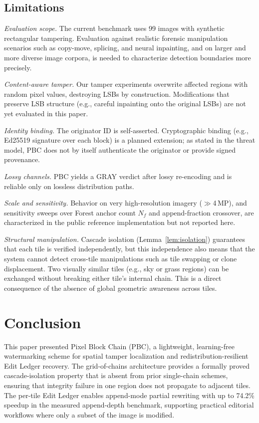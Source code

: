 \documentclass[conference]{IEEEtran}
\begin{document}
\subsection{Limitations}
\label{sec:limitations}

\emph{Evaluation scope.} The current benchmark uses 99 images with
synthetic rectangular tampering. Evaluation against realistic forensic
manipulation scenarios such as copy-move, splicing, and neural
inpainting, and on larger and more diverse image corpora, is needed to
characterize detection boundaries more precisely.

\emph{Content-aware tamper.} Our tamper experiments overwrite affected
regions with random pixel values, destroying LSBs by construction.
Modifications that preserve LSB structure (e.g., careful inpainting
onto the original LSBs) are not yet evaluated in this paper.

\emph{Identity binding.} The originator ID is self-asserted.
Cryptographic binding (e.g., Ed25519 signature over each block) is a
planned extension; as stated in the threat model, PBC does not by itself authenticate the originator or provide signed provenance.

\emph{Lossy channels.} PBC yields a GRAY verdict after lossy
re-encoding and is reliable only on lossless distribution paths.

\emph{Scale and sensitivity.} Behavior on very high-resolution imagery
($\gg$4\,MP), and sensitivity sweeps over Forest anchor count $N_f$
and append-fraction crossover, are characterized in the public
reference implementation but not reported here.

\emph{Structural manipulation.} Cascade isolation
(Lemma~\ref{lem:isolation}) guarantees that each tile is verified
independently, but this independence also means that the system
cannot detect cross-tile manipulations such as tile swapping or
clone displacement. Two visually similar tiles (e.g., sky or grass
regions) can be exchanged without breaking either tile's internal
chain. This is a direct consequence of the absence of global
geometric awareness across tiles.

\section{Conclusion}
\label{sec:conclusion}

This paper presented Pixel Block Chain (PBC), a lightweight,
learning-free watermarking scheme for spatial tamper localization and
redistribution-resilient Edit Ledger recovery. The grid-of-chains architecture
provides a formally proved cascade-isolation property that is absent
from prior single-chain schemes, ensuring that integrity failure in one
region does not propagate to adjacent tiles. The per-tile Edit Ledger
enables append-mode partial rewriting with up to 74.2\% speedup in the
measured append-depth benchmark, supporting practical editorial
workflows where only a subset of the image is modified.
\end{document}
